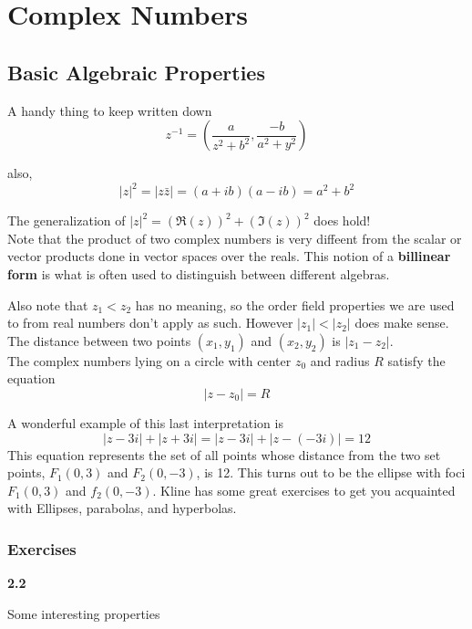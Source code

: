 \section{Complex Numbers}

\subsection{Basic Algebraic Properties}

A handy thing to keep written down
$$
z^{-1} = \left(\frac{a}{z^2 + b^2}, \frac{-b}{a^2 + y^2}\right)
$$

also,
$$
|z|^2 = |z\bar{z}| = (a + ib)(a - ib) = a^2 + b^2
$$

The generalization of $|z|^2 = (\Re(z))^2 + (\Im(z))^2$ does hold!
\\


Note that the product of two complex numbers is very diffeent from the scalar or vector products
done in vector spaces over the reals.
This notion of a \textbf{billinear form} is what is often used to distinguish between different
algebras.

Also note that $z_1 < z_2$ has no meaning, so the order field properties we are used to from
real numbers don't apply as such.
However $|z_1| < |z_2|$ does make sense.
\\

The distance between two points $(x_1, y_1)$ and $(x_2, y_2)$ is $|z_1 - z_2|$.
\\

The complex numbers lying on a circle with center $z_0$ and radius $R$ satisfy the equation
$$
|z - z_0| = R
$$

A wonderful example of this last interpretation is
$$
|z - 3i| + |z + 3i| = |z - 3i| + |z - (-3i)| = 12
$$
This equation represents the set of all points whose distance from the two set points, $F_1(0,3)$
and $F_2(0,-3)$, is 12.
This turns out to be the ellipse with foci $F_1(0,3)$ and $f_2(0,-3)$.
Kline has some great exercises to get you acquainted with Ellipses, parabolas, and hyperbolas.


\subsubsection{Exercises}

\textbf{2.2}

Some interesting properties

